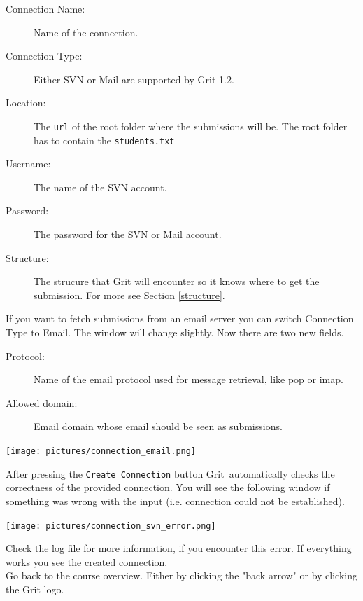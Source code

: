 \documentclass[10pt,a4paper, titlepage, toc=idx]{scrreprt}
\theoremstyle{definition}
\theoremstyle{plain}
\newcommand*{\product}{Grit}
\newcommand*{\version}{1.2}
\begin{document}
	\begin{description}
        \item[Connection Name:] Name of the connection.
        \item[Connection Type:] Either SVN or Mail are supported by \product{} \version.
        \item[Location:] The {\tt url} of the root folder where the
          submissions will be. The root folder has to contain the \texttt{students.txt}
        \item[Username:] The name of the SVN account.
        \item[Password:] The password for the SVN or Mail
          account.
        \item[Structure:] The strucure that \product{} will encounter
          so it knows where to get the submission. For more see
          Section \ref{structure}.
	\end{description}

If you want to fetch submissions from an email server you can switch Connection Type to Email. The window will change slightly. Now there are two new fields.

\begin{description}
        \item[Protocol:] Name of the email protocol used for message retrieval, like pop or imap.
        \item[Allowed domain:] Email domain whose email should be seen as submissions.
\end{description}

\begin{center}
	\texttt{[image: pictures/connection\_email.png]}
\end{center}

After pressing the {\tt Create Connection} button \product\ automatically checks the correctness of the provided connection. You will see the following window if something was wrong with the input (i.e. connection could not be established).

\begin{center}
	\texttt{[image: pictures/connection\_svn\_error.png]}
\end{center}

Check the log file for more information, if you encounter this error. If everything works you see the created connection.\\

Go back to the course overview. Either by clicking the "back arrow" or by clicking the \product{} logo.
\end{document}
